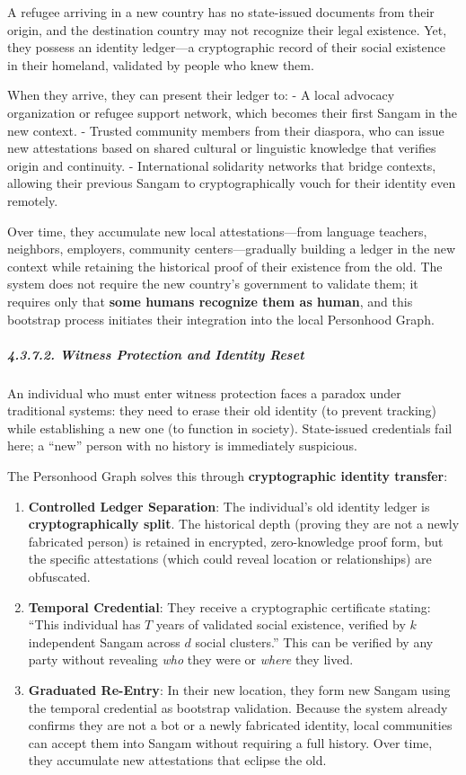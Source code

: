 A refugee arriving in a new country has no state-issued documents from
their origin, and the destination country may not recognize their legal
existence. Yet, they possess an identity ledger---a cryptographic record
of their social existence in their homeland, validated by people who
knew them.

When they arrive, they can present their ledger to: - A local advocacy
organization or refugee support network, which becomes their first
Sangam in the new context. - Trusted community members from their
diaspora, who can issue new attestations based on shared cultural or
linguistic knowledge that verifies origin and continuity. -
International solidarity networks that bridge contexts, allowing their
previous Sangam to cryptographically vouch for their identity even
remotely.

Over time, they accumulate new local attestations---from language
teachers, neighbors, employers, community centers---gradually building a
ledger in the new context while retaining the historical proof of their
existence from the old. The system does not require the new country's
government to validate them; it requires only that \textbf{some humans
recognize them as human}, and this bootstrap process initiates their
integration into the local Personhood Graph.

\subparagraph{4.3.7.2. Witness Protection and Identity
Reset}\label{witness-protection-and-identity-reset}

An individual who must enter witness protection faces a paradox under
traditional systems: they need to erase their old identity (to prevent
tracking) while establishing a new one (to function in society).
State-issued credentials fail here; a ``new'' person with no history is
immediately suspicious.

The Personhood Graph solves this through \textbf{cryptographic identity
transfer}:

\begin{enumerate}
\def\labelenumi{\arabic{enumi}.}
\item
  \textbf{Controlled Ledger Separation}: The individual's old identity
  ledger is \textbf{cryptographically split}. The historical depth
  (proving they are not a newly fabricated person) is retained in
  encrypted, zero-knowledge proof form, but the specific attestations
  (which could reveal location or relationships) are obfuscated.
\item
  \textbf{Temporal Credential}: They receive a cryptographic certificate
  stating: ``This individual has \(T\) years of validated social
  existence, verified by \(k\) independent Sangam across \(d\) social
  clusters.'' This can be verified by any party without revealing
  \emph{who} they were or \emph{where} they lived.
\item
  \textbf{Graduated Re-Entry}: In their new location, they form new
  Sangam using the temporal credential as bootstrap validation. Because
  the system already confirms they are not a bot or a newly fabricated
  identity, local communities can accept them into Sangam without
  requiring a full history. Over time, they accumulate new attestations
  that eclipse the old.
\end{enumerate}

